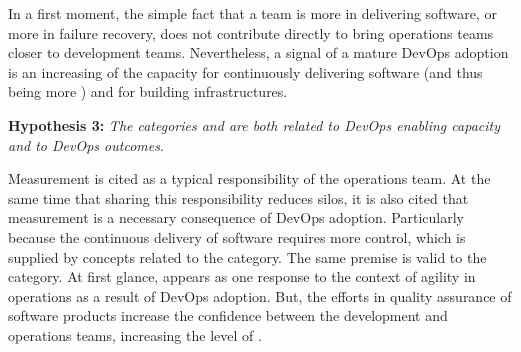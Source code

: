 In a first moment, the simple fact that a team is more
 in delivering software, or more  in failure recovery, does not
contribute directly to bring operations teams closer to development teams.
Nevertheless, a signal of a mature DevOps adoption is an increasing of the capacity for continuously
delivering software (and thus being more )
and for building  infrastructures.

\begin{mh}
\textbf{Hypothesis 3:} \textit{The categories  and 
are both related to DevOps enabling capacity and to DevOps outcomes}.
\end{mh}

Measurement is cited as a typical responsibility of the operations team.
At the same time that sharing this responsibility reduces silos,
it is also cited that measurement is a necessary consequence of DevOps adoption. Particularly because
the continuous delivery of software requires more control,
which is supplied by concepts related to the  category.
The same premise is valid to the  category. At first glance,
 appears as one response to the context of agility in operations
as a result of DevOps adoption. But, the efforts in quality assurance of software products
increase the confidence between the development and operations teams, increasing the level
of \cc.


